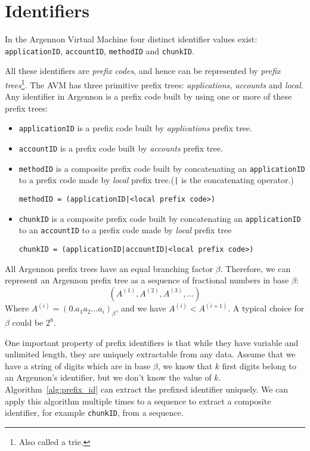 \section{Identifiers}\label{sec:identifiers}

In the Argennon Virtual Machine four distinct identifier values exist: \texttt{applicationID}, \texttt{accountID},
\texttt{methodID} and \texttt{chunkID}.

All these identifiers are \emph{prefix codes}, and hence can be represented by
\emph{prefix trees}\footnote{Also called a trie.}. The AVM has three primitive prefix trees:
\emph{applications, accounts} and \emph{local}. Any identifier in Argennon is a
prefix code built by using one or more of these prefix trees:
\begin{itemize}
    \item \texttt{applicationID} is a prefix code built by \emph{applications} prefix tree.
    \item \texttt{accountID} is a prefix code built by \emph{accounts} prefix tree.
    \item \texttt{methodID} is a composite prefix code built by concatenating an \texttt{applicationID} to
    a prefix code made by \emph{local} prefix tree.(\texttt{|} is the concatenating operator.)

    \texttt{methodID = (applicationID|<local prefix code>)}
    \item \texttt{chunkID} is a composite prefix code built by concatenating an \texttt{applicationID} to
    an \texttt{accountID} to a prefix code made by \emph{local} prefix tree

    \texttt{chunkID = (applicationID|accountID|<local prefix code>)}
\end{itemize}

All Argennon prefix trees have an equal branching factor \(\beta\). Therefore, we can represent an Argennon
prefix tree as a sequence of fractional numbers in base \(\beta\):
\[
    (A^{(1)},A^{(2)},A^{(3)},\dots)
\]
Where \(A^{(i)}=(0.a_{1}a_{2}\dots a_{i})_\beta\), and we have \(A^{(i)}<A^{(i+1)}\). A typical choice for \(\beta\)
could be \(2^8\).

One important property of prefix identifiers is that while they have variable and unlimited length, they are
uniquely extractable from any data. Assume that we have a string of digits which are in base $\beta$, we
know that $k$ first digits belong to an Argennon's identifier, but we don't know the value of $k$.
Algorithm~\ref{alg:prefix_id} can extract the prefixed identifier uniquely. We can apply this algorithm
multiple times to a sequence to extract a composite identifier, for example \texttt{chunkID}, from a sequence.

